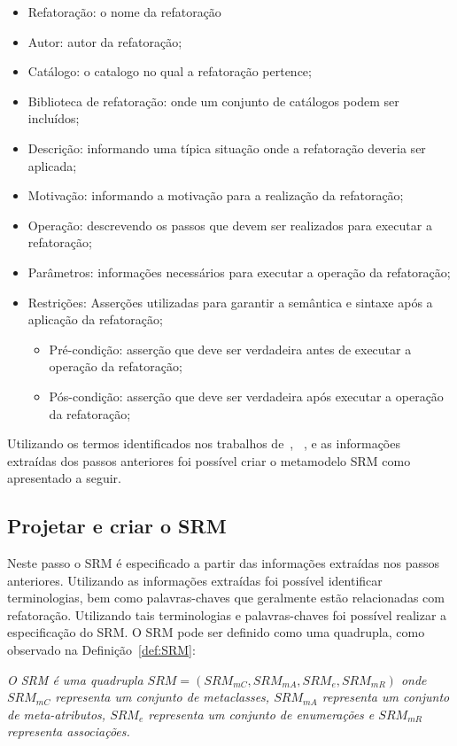 \begin{itemize}
\item Refatoração: o nome da refatoração
\item Autor: autor da refatoração;
\item Catálogo: o catalogo no qual a refatoração pertence;
\item Biblioteca de refatoração: onde um conjunto de catálogos podem ser incluídos;
\item Descrição: informando uma típica situação onde a refatoração deveria ser aplicada;
\item Motivação: informando a motivação para a realização da refatoração;
\item Operação: descrevendo os passos que devem ser realizados para executar a refatoração;
\item Parâmetros: informações necessários para executar a operação da refatoração;
\item Restrições: Asserções utilizadas para garantir a semântica e sintaxe após a aplicação da refatoração;
\begin{itemize}
\item Pré-condição: asserção que deve ser verdadeira antes de executar a operação da refatoração;
\item Pós-condição: asserção que deve ser verdadeira após executar a operação da refatoração;
\end{itemize}
\end{itemize}

Utilizando os termos identificados nos trabalhos de~, ~, e as informações extraídas dos passos anteriores foi possível criar o metamodelo SRM como apresentado a seguir. 

\subsection{Projetar e criar o SRM}

Neste passo o SRM é especificado a partir das informações extraídas nos passos anteriores. Utilizando as informações extraídas foi possível identificar terminologias, bem como palavras-chaves que geralmente estão relacionadas com refatoração. Utilizando tais terminologias e palavras-chaves foi possível realizar a especificação do SRM. O SRM pode ser definido como uma quadrupla, como observado na Definição~\ref{def:SRM}: 


\begin{definicao}\label{def:SRM}
    \textit{O SRM é uma quadrupla $SRM = (SRM_{mC}, SRM_{mA}, SRM_{e}, SRM_{mR})$ onde $SRM_{mC} $ representa um conjunto de metaclasses, $SRM_{mA}$ representa um conjunto de meta-atributos, $SRM_{e}$ representa um conjunto de enumerações e $SRM_{mR}$ representa associações.}
\end{definicao}

